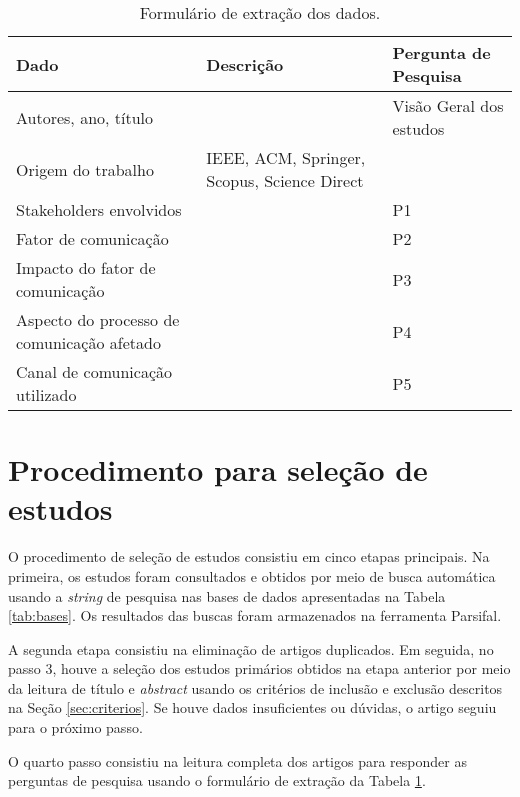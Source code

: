     \begin{table}[h]
    \centering
    \scriptsize
    \caption{Formulário de extração dos dados.}
    \label{tab:extraction}
    \begin{tabular}{p{5cm}p{6cm}p{4cm}}
    \hline
    \textbf{Dado} & \textbf{Descrição}  & \textbf{Pergunta de Pesquisa}\\ \hline
    Autores, ano, título     &  &Visão Geral dos estudos  \\ \hline
    Origem do trabalho       & IEEE, ACM, Springer, Scopus, Science Direct    \\ \hline
  
   Stakeholders envolvidos & &P1  \\ \hline
    
    Fator  de comunicação   & &P2 \\ \hline
    
    Impacto do fator de comunicação & &P3 \\ \hline
   
    Aspecto do processo de comunicação afetado & &P4 \\ \hline
   
    Canal de comunicação utilizado & &P5 \\ \hline
   
  
    \end{tabular}
    \end{table}
        
\section{Procedimento para seleção de estudos}

        O procedimento de seleção de estudos consistiu em cinco etapas principais. Na primeira, os estudos foram consultados e obtidos por meio de busca automática usando a \emph{string} de pesquisa nas bases de dados apresentadas na Tabela \ref{tab:bases}. Os resultados das buscas foram armazenados na ferramenta Parsifal.

        A segunda etapa consistiu na eliminação de artigos duplicados. Em seguida, no passo 3, houve a seleção dos estudos primários obtidos na etapa anterior por meio da leitura de título e \emph{abstract} usando os critérios de inclusão e exclusão descritos na Seção \ref{sec:criterios}. Se houve dados insuficientes ou dúvidas, o artigo seguiu para o próximo passo.
        
        O quarto passo consistiu na leitura completa dos artigos para responder as perguntas de pesquisa usando o formulário de extração da Tabela \ref{tab:extraction}.
      
